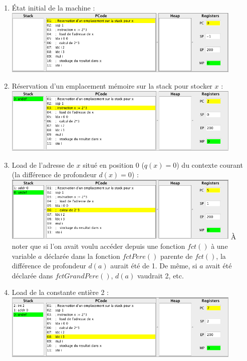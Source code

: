 \documentclass[french,11pt,twoside]{article}
\begin{document}
\begin{enumerate}
\item \'{E}tat initial de la machine : \\
            \includegraphics[width=0.9\textwidth]{images/exemple1-step0}
\item Réservation d'un emplacement mémoire sur la stack pour stocker $x$ : \\
            \includegraphics[width=0.9\textwidth]{images/exemple1-step1}
\item Load de l'adresse de $x$ situé en position 0 ($q(x)=0$) du contexte courant (la différence de profondeur $d(x)=0$) : \\
            \includegraphics[width=0.9\textwidth]{images/exemple1-step2} 
            \`A noter que si l'on avait voulu accéder depuis une fonction $fct()$ à une variable $a$ déclarée dans la fonction $fctPere()$ parente de $fct()$, la différence de profondeur $d(a)$ aurait été de 1. De même, si $a$ avait été déclarée dans $fctGrandPere()$, $d(a)$  vaudrait 2, etc.
\item Load de la constante entière 2 :\\
            \includegraphics[width=0.9\textwidth]{images/exemple1-step3} 

\end{enumerate}
\end{document}
